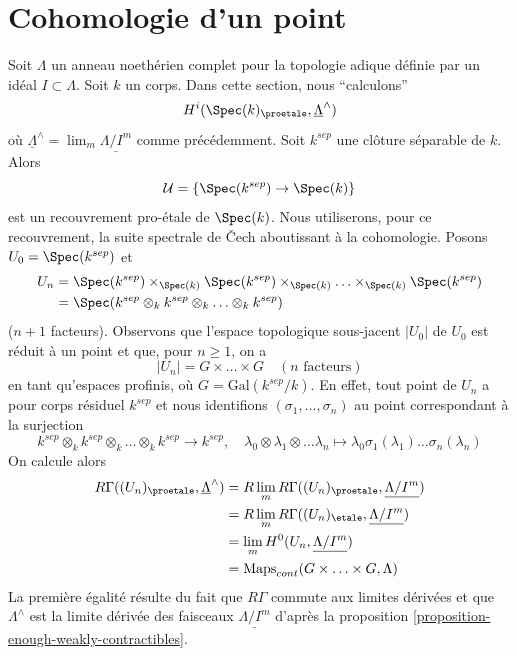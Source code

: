 \section{Cohomologie d'un point}
\label{section-cohomology-point}

\noindent
Soit $\Lambda$ un anneau noethérien complet pour la topologie adique définie par un idéal
$I \subset \Lambda$. Soit $k$ un corps. Dans cette section, nous ``calculons''
$$
H^i(\Spec(k)_\proetale, \underline{\Lambda}^\wedge)
$$
où $\underline{\Lambda}^\wedge = \lim_m \underline{\Lambda/I^m}$ comme précédemment.
Soit $k^{sep}$ une clôture séparable de $k$.
Alors
$$
\mathcal{U} = \{\Spec(k^{sep}) \to \Spec(k)\}
$$
est un recouvrement pro-\'etale de $\Spec(k)$. Nous utiliserons, pour ce recouvrement, la suite spectrale de {\v C}ech
aboutissant à la cohomologie.
Posons $U_0 = \Spec(k^{sep})$ et
\begin{align*}
U_n & =
\Spec(k^{sep}) \times_{\Spec(k)}
\Spec(k^{sep}) \times_{\Spec(k)} \ldots
\times_{\Spec(k)} \Spec(k^{sep}) \\
& =
\Spec(k^{sep} \otimes_k k^{sep} \otimes_k \ldots \otimes_k k^{sep})
\end{align*}
($n + 1$ facteurs). Observons que l'espace topologique sous-jacent
$|U_0|$ de $U_0$ est réduit à un point et que, pour $n \geq 1$, on a
$$
|U_n| = G \times \ldots \times G\quad (n\text{ facteurs})
$$
en tant qu'espaces profinis, où $G = \text{Gal}(k^{sep}/k)$. En effet, tout
point de $U_n$ a pour corps résiduel $k^{sep}$ et nous identifions
$(\sigma_1, \ldots, \sigma_n)$ au point correspondant à la
surjection
$$
k^{sep} \otimes_k k^{sep} \otimes_k \ldots \otimes_k k^{sep}
\longrightarrow k^{sep}, \quad
\lambda_0 \otimes \lambda_1 \otimes \ldots \lambda_n
\longmapsto \lambda_0 \sigma_1(\lambda_1) \ldots \sigma_n(\lambda_n)
$$
On calcule alors
\begin{align*}
R\Gamma((U_n)_\proetale, \underline{\Lambda}^\wedge)
& =
R\lim_m R\Gamma((U_n)_\proetale, \underline{\Lambda/I^m}) \\
& =
R\lim_m R\Gamma((U_n)_\etale, \underline{\Lambda/I^m}) \\
& =
\lim_m H^0(U_n, \underline{\Lambda/I^m}) \\
& = 
\text{Maps}_{cont}(G \times \ldots \times G, \Lambda)
\end{align*}
La première égalité résulte du fait que $R\Gamma$ commute aux limites dérivées
et que $\Lambda^\wedge$ est la limite dérivée des faisceaux
$\underline{\Lambda/I^m}$ d'après
la proposition \ref{proposition-enough-weakly-contractibles}.

